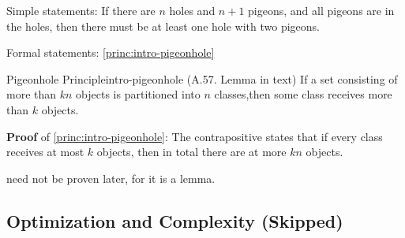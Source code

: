 \documentclass[../src/handouts/main.tex]{subfiles}
\begin{document}
Simple statements: If there are $n$ holes and $n + 1$ pigeons, and all pigeons are in the holes, then there must be at least one hole with two pigeons.

Formal statements: \cref{princ:intro-pigeonhole}

\begin{principle}{Pigeonhole Principle}{intro-pigeonhole}
  (A.57. Lemma in text)
  If a set consisting of more than $kn$ objects is partitioned into $n$ classes,then some class receives more than $k$ objects.
\end{principle}

\textbf{Proof} of \cref{princ:intro-pigeonhole}: The contrapositive states that if every class receives at most $k$ objects, then in total there are at more $kn$ objects.

 need not be proven later, for it is a lemma.

\subsection{Optimization and Complexity (Skipped)}
\end{document}
